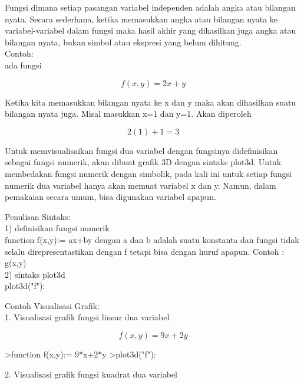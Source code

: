 \documentclass[a4paper,10pt]{article}
\begin{document}
\begin{eulernotebook}
\begin{eulercomment}
\end{eulercomment}
\begin{eulercomment}
Fungsi dimana setiap pasangan variabel independen adalah angka atau
bilangan nyata. Secara sederhana, ketika memasukkan angka atau
bilangan nyata ke variabel-variabel dalam fungsi maka hasil akhir yang
dihasilkan juga angka atau bilangan nyata, bukan simbol atau ekspresi
yang belum dihitung.\\
Contoh:\\
ada fungsi\\
\end{eulercomment}
\begin{eulerformula}
\[
f(x,y)=2x+y
\]
\end{eulerformula}
\begin{eulercomment}
Ketika kita memasukkan bilangan nyata ke x dan y maka akan dihasilkan
suatu bilangan nyata juga. Misal masukkan x=1 dan y=1. Akan diperoleh

\end{eulercomment}
\begin{eulerformula}
\[
2(1)+1=3
\]
\end{eulerformula}
\begin{eulercomment}
\end{eulercomment}
\begin{eulercomment}
Untuk memvisualisaikan fungsi dua variabel dengan fungsinya
didefinisikan sebagai fungsi numerik, akan dibuat grafik 3D dengan
sintaks plot3d. Untuk membedakan fungsi numerik dengan simbolik, pada
kali ini untuk setiap fungsi numerik dua variabel hanya akan memuat
variabel x dan y. Namun, dalam pemakaian secara umum, bisa digunakan
variabel apapun.

Penulisan Sintaks:\\
1) definisikan fungsi numerik\\
function f(x,y):= ax+by dengan a dan b adalah suatu konstanta dan
fungsi tidak selalu direpresentastikan dengan f tetapi bisa dengan
huruf apapun. Contoh : g(x,y)\\
2) sintaks plot3d\\
plot3d("f"):

Contoh Visualisasi Grafik:\\
1. Visualisasi grafik fungsi linear dua variabel

\end{eulercomment}
\begin{eulerformula}
\[
f(x,y) = 9x+2y
\]
\end{eulerformula}
\begin{eulerprompt}
>function f(x,y):= 9*x+2*y
>plot3d("f"):
\end{eulerprompt}
\begin{eulercomment}
2. Visualisasi grafik fungsi kuadrat dua variabel


\end{eulercomment}
\end{eulernotebook}
\end{document}
